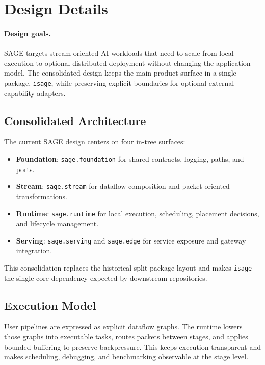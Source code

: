 \section{Design Details}
\label{sec:design_details}

\paragraph{Design goals.}
SAGE targets stream-oriented AI workloads that need to scale from local execution to optional distributed deployment without changing the application model. The consolidated design keeps the main product surface in a single package, \texttt{isage}, while preserving explicit boundaries for optional external capability adapters.

\subsection{Consolidated Architecture}
\label{subsec:dd_arch_overview}

The current SAGE design centers on four in-tree surfaces:
\begin{itemize}
  \item \textbf{Foundation}: \texttt{sage.foundation} for shared contracts, logging, paths, and ports.
  \item \textbf{Stream}: \texttt{sage.stream} for dataflow composition and packet-oriented transformations.
  \item \textbf{Runtime}: \texttt{sage.runtime} for local execution, scheduling, placement decisions, and lifecycle management.
  \item \textbf{Serving}: \texttt{sage.serving} and \texttt{sage.edge} for service exposure and gateway integration.
\end{itemize}

This consolidation replaces the historical split-package layout and makes \texttt{isage} the single core dependency expected by downstream repositories.

\subsection{Execution Model}
\label{subsec:dd_execution}

User pipelines are expressed as explicit dataflow graphs. The runtime lowers those graphs into executable tasks, routes packets between stages, and applies bounded buffering to preserve backpressure. This keeps execution transparent and makes scheduling, debugging, and benchmarking observable at the stage level.

